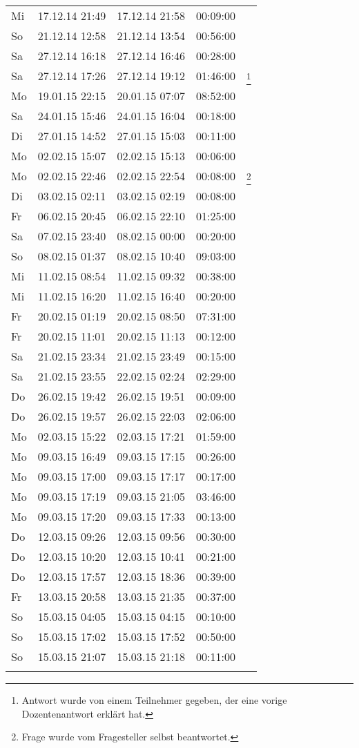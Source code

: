\begin{longtable}{lrrrr}
Mi & 17.12.14 21:49 & 17.12.14 21:58 & 00:09:00 &  \\
So & 21.12.14 12:58 & 21.12.14 13:54 & 00:56:00 &  \\
Sa & 27.12.14 16:18 & 27.12.14 16:46 & 00:28:00 &  \\
Sa & 27.12.14 17:26 & 27.12.14 19:12 & 01:46:00 & \footnote{Antwort wurde von einem Teilnehmer gegeben, der eine vorige Dozentenantwort erklärt hat.} \\
Mo & 19.01.15 22:15 & 20.01.15 07:07 & 08:52:00 &  \\
Sa & 24.01.15 15:46 & 24.01.15 16:04 & 00:18:00 &  \\
Di & 27.01.15 14:52 & 27.01.15 15:03 & 00:11:00 &  \\
Mo & 02.02.15 15:07 & 02.02.15 15:13 & 00:06:00 &  \\
Mo & 02.02.15 22:46 & 02.02.15 22:54 & 00:08:00 & \footnote{Frage wurde vom Fragesteller selbst beantwortet.} \\
Di & 03.02.15 02:11 & 03.02.15 02:19 & 00:08:00 &  \\
Fr & 06.02.15 20:45 & 06.02.15 22:10 & 01:25:00 &  \\
Sa & 07.02.15 23:40 & 08.02.15 00:00 & 00:20:00 &  \\
So & 08.02.15 01:37 & 08.02.15 10:40 & 09:03:00 &  \\
Mi & 11.02.15 08:54 & 11.02.15 09:32 & 00:38:00 &  \\
Mi & 11.02.15 16:20 & 11.02.15 16:40 & 00:20:00 &  \\
Fr & 20.02.15 01:19 & 20.02.15 08:50 & 07:31:00 &  \\
Fr & 20.02.15 11:01 & 20.02.15 11:13 & 00:12:00 &  \\
Sa & 21.02.15 23:34 & 21.02.15 23:49 & 00:15:00 &  \\
Sa & 21.02.15 23:55 & 22.02.15 02:24 & 02:29:00 &  \\
Do & 26.02.15 19:42 & 26.02.15 19:51 & 00:09:00 &  \\
Do & 26.02.15 19:57 & 26.02.15 22:03 & 02:06:00 &  \\
Mo & 02.03.15 15:22 & 02.03.15 17:21 & 01:59:00 &  \\
Mo & 09.03.15 16:49 & 09.03.15 17:15 & 00:26:00 &  \\
Mo & 09.03.15 17:00 & 09.03.15 17:17 & 00:17:00 &  \\
Mo & 09.03.15 17:19 & 09.03.15 21:05 & 03:46:00 &  \\
Mo & 09.03.15 17:20 & 09.03.15 17:33 & 00:13:00 &  \\
Do & 12.03.15 09:26 & 12.03.15 09:56 & 00:30:00 &  \\
Do & 12.03.15 10:20 & 12.03.15 10:41 & 00:21:00 &  \\
Do & 12.03.15 17:57 & 12.03.15 18:36 & 00:39:00 &  \\
Fr & 13.03.15 20:58 & 13.03.15 21:35 & 00:37:00 &  \\
So & 15.03.15 04:05 & 15.03.15 04:15 & 00:10:00 &  \\
So & 15.03.15 17:02 & 15.03.15 17:52 & 00:50:00 &  \\
So & 15.03.15 21:07 & 15.03.15 21:18 & 00:11:00 &  \\
\label{tab:erp4students}
\end{longtable}
